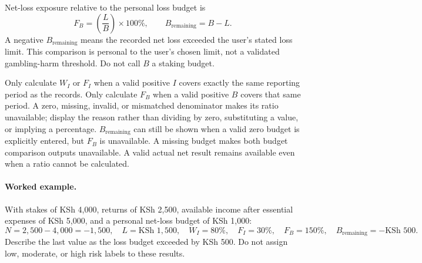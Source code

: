 \documentclass[11pt,a4paper]{article}
\begin{document}
Net-loss exposure relative to the personal loss budget is
\[
F_B = \left(\frac{L}{B}\right)\times 100\%,
\qquad
B_{\mathrm{remaining}} = B-L.
\]
A negative \(B_{\mathrm{remaining}}\) means the recorded net loss exceeded the user's stated loss limit. This comparison is personal to the user's chosen limit, not a validated gambling-harm threshold. Do not call \(B\) a staking budget.

Only calculate \(W_I\) or \(F_I\) when a valid positive \(I\) covers exactly the same reporting period as the records. Only calculate \(F_B\) when a valid positive \(B\) covers that same period. A zero, missing, invalid, or mismatched denominator makes its ratio unavailable; display the reason rather than dividing by zero, substituting a value, or implying a percentage. \(B_{\mathrm{remaining}}\) can still be shown when a valid zero budget is explicitly entered, but \(F_B\) is unavailable. A missing budget makes both budget comparison outputs unavailable. A valid actual net result remains available even when a ratio cannot be calculated.

\paragraph{Worked example.}
With stakes of KSh 4,000, returns of KSh 2,500, available income after essential expenses of KSh 5,000, and a personal net-loss budget of KSh 1,000:
\[
N = 2{,}500-4{,}000=-1{,}500,\quad L=\text{KSh }1{,}500,
\quad W_I=80\%,\quad F_I=30\%,\quad F_B=150\%,
\quad B_{\mathrm{remaining}}=-\text{KSh }500.
\]
Describe the last value as the loss budget exceeded by KSh 500. Do not assign low, moderate, or high risk labels to these results.
\end{document}
